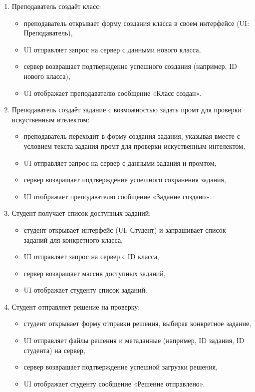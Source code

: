 \begin{enumerate}
    \item Преподаватель создаёт класс:
    \begin{itemize}
        \item преподаватель открывает форму создания класса в своем интерфейсе (UI: Преподаватель),
        \item UI отправляет запрос на сервер с данными нового класса,
        \item сервер возвращает подтверждение успешного создания (например, ID нового класса),
        \item UI отображает преподавателю сообщение «Класс создан».
    \end{itemize}

    \item Преподаватель создаёт задание с возможностью задать промт для проверки искуственным ителектом:
    \begin{itemize}
        \item преподаватель переходит в форму создания задания, указывая вместе с условием текста задания промт для проверки искуственным интелектом,
        \item UI отправляет запрос на сервер с данными задания и промтом,
        \item сервер возвращает подтверждение успешного сохранения задания,
        \item UI отображает преподавателю сообщение «Задание создано».
    \end{itemize}

    \item Студент получает список доступных заданий:
    \begin{itemize}
        \item студент открывает интерфейс (UI: Студент) и запрашивает список заданий для конкретного класса,
        \item UI отправляет запрос на сервер с ID класса,
        \item сервер возвращает массив доступных заданий,
        \item UI отображает студенту список заданий.
    \end{itemize}

    \item Студент отправляет решение на проверку:
    \begin{itemize}
        \item студент открывает форму отправки решения, выбирая конкретное задание,
        \item UI отправляет файлы решения и метаданные (например, ID задания, ID студента) на сервер,
        \item сервер возвращает подтверждение успешной загрузки решения,
        \item UI отображает студенту сообщение «Решение отправлено».
    \end{itemize}


\end{enumerate}
